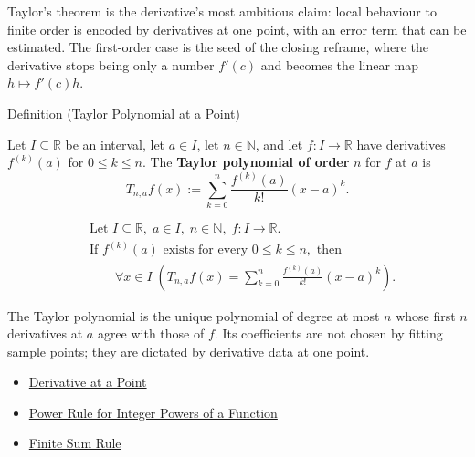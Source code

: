 \label{sec:taylor}

\begin{exposition}
Taylor's theorem is the derivative's most ambitious claim: local behaviour to
finite order is encoded by derivatives at one point, with an error term that
can be estimated. The first-order case is the seed of the closing reframe,
where the derivative stops being only a number \(f'(c)\) and becomes the
linear map \(h\mapsto f'(c)h\).
\end{exposition}


\begin{definitionbox}{Definition (Taylor Polynomial at a Point)}
\begin{definition}
\label{def:taylor-polynomial-at-a-point}
Let $I\subseteq\mathbb{R}$ be an interval, let $a\in I$, let
$n\in\mathbb{N}$, and let $f:I\to\mathbb{R}$ have derivatives
$f^{(k)}(a)$ for $0\le k\le n$. The \textbf{Taylor polynomial of order}
$n$ for $f$ at $a$ is
\[
  T_{n,a}f(x)
  :=
  \sum_{k=0}^{n}\frac{f^{(k)}(a)}{k!}(x-a)^k.
\]
\end{definition}
\end{definitionbox}

\begin{remark*}
\[
\begin{aligned}
&\text{Let } I\subseteq\mathbb{R},\; a\in I,\; n\in\mathbb{N},\;
f:I\to\mathbb{R}.\\
&\text{If } f^{(k)}(a)\text{ exists for every }0\le k\le n,\text{ then}\\
&\qquad
\forall x\in I\;
\left(
  T_{n,a}f(x)=\sum_{k=0}^{n}\frac{f^{(k)}(a)}{k!}(x-a)^k
\right).
\end{aligned}
\]
\end{remark*}

\begin{remark*}[Interpretation]
The Taylor polynomial is the unique polynomial of degree at most $n$ whose
first $n$ derivatives at $a$ agree with those of $f$. Its coefficients are
not chosen by fitting sample points; they are dictated by derivative data at
one point.
\end{remark*}

\begin{dependencies}
\begin{itemize}
  \item \hyperref[def:derivative-at-a-point]{Derivative at a Point}
  \item \hyperref[cor:power-rule-special-case]{Power Rule for Integer Powers of a Function}
  \item \hyperref[cor:finite-sum-rule]{Finite Sum Rule}
\end{itemize}
\end{dependencies}

